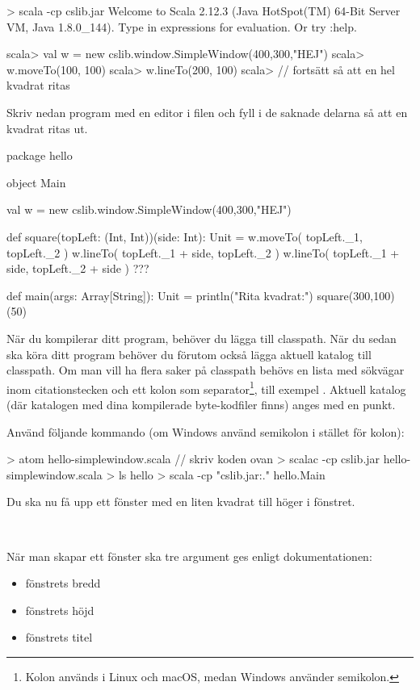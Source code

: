 \begin{REPL}
> scala -cp cslib.jar
Welcome to Scala 2.12.3 (Java HotSpot(TM) 64-Bit Server VM, Java 1.8.0_144).
Type in expressions for evaluation. Or try :help.

scala> val w = new cslib.window.SimpleWindow(400,300,"HEJ")
scala> w.moveTo(100, 100)
scala> w.lineTo(200, 100)
scala> // fortsätt så att en hel kvadrat ritas
\end{REPL}

\Subtask Skriv nedan program med en editor i filen  och fyll i de saknade delarna så att en kvadrat ritas ut.

\begin{Code}
package hello

object Main {
  val w = new cslib.window.SimpleWindow(400,300,"HEJ")

  def square(topLeft: (Int, Int))(side: Int): Unit = {
    w.moveTo( topLeft._1,        topLeft._2        )
    w.lineTo( topLeft._1 + side, topLeft._2        )
    w.lineTo( topLeft._1 + side, topLeft._2 + side )
    ???
  }

  def main(args: Array[String]): Unit = {
    println("Rita kvadrat:")
    square(300,100)(50)
  }
}
\end{Code}

\noindent
När du kompilerar ditt program, behöver du lägga  till classpath.
När du sedan ska köra ditt program behöver du förutom   också lägga aktuell katalog till classpath. Om man vill ha flera saker på classpath behövs en lista med sökvägar inom citationstecken och ett kolon som separator\footnote{Kolon används i Linux och macOS, medan Windows använder semikolon.}, till exempel .
Aktuell katalog (där katalogen  med dina kompilerade byte-kodfiler finns) anges med en punkt.

Använd följande kommando (om Windows använd semikolon i stället för kolon):
\begin{REPL}
> atom hello-simplewindow.scala  // skriv koden ovan
> scalac -cp cslib.jar hello-simplewindow.scala
> ls hello
> scala -cp "cslib.jar:." hello.Main
\end{REPL}
\noindent Du ska nu få upp ett fönster med en liten kvadrat till höger i fönstret.


\SOLUTION

\TaskSolved \what~

\SubtaskSolved När man skapar ett fönster ska tre argument ges enligt dokumentationen:
\begin{itemize}[nolistsep,noitemsep]
  \item {} fönstrets bredd
  \item {} fönstrets höjd
  \item {} fönstrets titel
\end{itemize}


